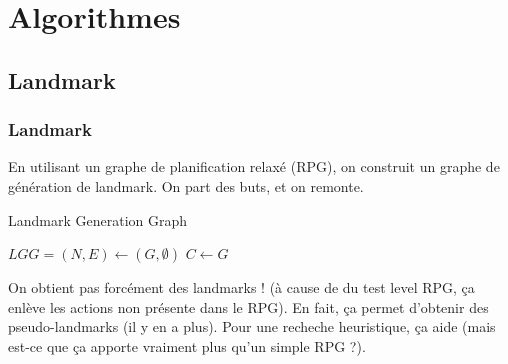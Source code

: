\section{Algorithmes}
  \subsection{Landmark}
\begin{frame}
  \frametitle{Landmark}

  \begin{block}{}
    En utilisant un graphe de planification relaxé (RPG), on construit un graphe de génération de landmark.
    On part des buts, et on remonte.
  \end{block}

  \begin{block}{}
    \begin{algorithm*}[H]
      \tiny
      \caption{ Landmark Generation Graph}
      
      
     
      $LGG = (N, E) \leftarrow (G, \emptyset)$\;
      $C \leftarrow G$\;
    \end{algorithm*}
  \end{block}
\end{frame}

\begin{frame}
  \begin{block}{}
    On obtient pas forcément des landmarks ! (à cause de du test level RPG, ça enlève les actions non présente dans le RPG).
    En fait, ça permet d'obtenir des pseudo-landmarks (il y en a plus). Pour une recheche heuristique, ça aide (mais est-ce que ça apporte vraiment plus qu'un simple RPG ?).
  \end{block}
\end{frame}

